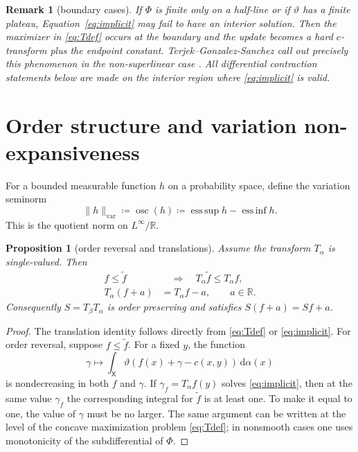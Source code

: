 \documentclass[11pt]{article}
\newtheorem{proposition}[theorem]{Proposition}
\newtheorem{remark}[theorem]{Remark}
\newcommand{\R}{\mathbb{R}}
\newcommand{\X}{\mathsf{X}}
\newcommand{\dd}{\,\mathrm{d}}
\newcommand{\osc}{\operatorname{osc}}
\newcommand{\esssup}{\operatorname*{ess\,sup}}
\newcommand{\essinf}{\operatorname*{ess\,inf}}
\newcommand{\defeq}{\coloneqq}
\begin{document}
\begin{remark}[boundary cases]
If $\Phi$ is finite only on a half-line or if $\vartheta$ has a finite plateau,
Equation~\eqref{eq:implicit} may fail to have an interior solution.  Then the
maximizer in \eqref{eq:Tdef} occurs at the boundary and the update becomes a
hard $c$-transform plus the endpoint constant.  Terjek--Gonzalez-Sanchez call
out precisely this phenomenon in the non-superlinear case \cite{terjek2022}.
All differential contraction statements below are made on the interior region
where \eqref{eq:implicit} is valid.
\end{remark}

\section{Order structure and variation non-expansiveness}\label{sec:order}

For a bounded measurable function $h$ on a probability space, define the
variation seminorm
\begin{equation*}
  \|h\|_{\mathrm{var}}
  \defeq \osc(h)
  \defeq \esssup h-\essinf h.
\end{equation*}
This is the quotient norm on $L^\infty/\R$.

\begin{proposition}[order reversal and translations]\label{prop:order}
Assume the transform $T_\alpha$ is single-valued.  Then
\begin{align}
  f\leq \tilde f
  &\quad\Longrightarrow\quad
  T_\alpha \tilde f\leq T_\alpha f,
  \label{eq:orderreversal}\\
  T_\alpha(f+a)&=T_\alpha f-a,
  \qquad a\in\R.\label{eq:translation}
\end{align}
Consequently $S=T_\beta T_\alpha$ is order preserving and satisfies
$S(f+a)=Sf+a$.
\end{proposition}

\begin{proof}
The translation identity follows directly from \eqref{eq:Tdef} or
\eqref{eq:implicit}.  For order reversal, suppose $f\leq \tilde f$.  For a fixed
$y$, the function
\begin{equation*}
  \gamma\mapsto
  \int_\X \vartheta(f(x)+\gamma-c(x,y))\dd\alpha(x)
\end{equation*}
is nondecreasing in both $f$ and $\gamma$.  If
$\gamma_f=T_\alpha f(y)$ solves \eqref{eq:implicit}, then at the same value
$\gamma_f$ the corresponding integral for $\tilde f$ is at least one.  To make
it equal to one, the value of $\gamma$ must be no larger.  The same argument can
be written at the level of the concave maximization problem \eqref{eq:Tdef}; in
nonsmooth cases one uses monotonicity of the subdifferential of $\Phi$.
\end{proof}
\end{document}
